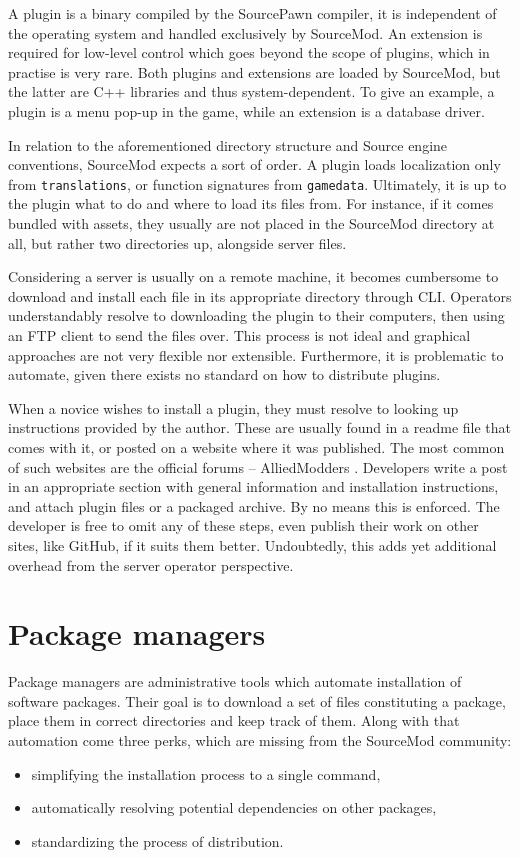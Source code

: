 A plugin is a binary compiled by the SourcePawn compiler, it is independent of the operating system and handled exclusively by SourceMod.
An extension is required for low-level control which goes beyond the scope of plugins, which in practise is very rare.
Both plugins and extensions are loaded by SourceMod, but the latter are C++ libraries and thus system-dependent.
To give an example, a plugin is a menu pop-up in the game, while an extension is a database driver.

In relation to the aforementioned directory structure and Source engine conventions, SourceMod expects a sort of order.
A plugin loads localization only from \verb|translations|, or function signatures from \verb|gamedata|.
Ultimately, it is up to the plugin what to do and where to load its files from.
For instance, if it comes bundled with assets, they usually are not placed in the SourceMod directory at all, but rather two directories up, alongside server files.

Considering a server is usually on a remote machine, it becomes cumbersome to download and install each file in its appropriate directory through CLI\@.
Operators understandably resolve to downloading the plugin to their computers, then using an FTP client to send the files over.
This process is not ideal and graphical approaches are not very flexible nor extensible.
Furthermore, it is problematic to automate, given there exists no standard on how to distribute plugins.

When a novice wishes to install a plugin, they must resolve to looking up instructions provided by the author.
These are usually found in a readme file that comes with it, or posted on a website where it was published.
The most common of such websites are the official forums -- AlliedModders \cite{alliedmodders-plugins}.
Developers write a post in an appropriate section with general information and installation instructions, and attach plugin files or a packaged archive.
By no means this is enforced.
The developer is free to omit any of these steps, even publish their work on other sites, like GitHub, if it suits them better.
Undoubtedly, this adds yet additional overhead from the server operator perspective.

\section{Package managers}

Package managers are administrative tools which automate installation of software packages.
Their goal is to download a set of files constituting a package, place them in correct directories and keep track of them.
Along with that automation come three perks, which are missing from the SourceMod community:
\begin{itemize}
    \item simplifying the installation process to a single command,
    \item automatically resolving potential dependencies on other packages,
    \item standardizing the process of distribution.
\end{itemize}

